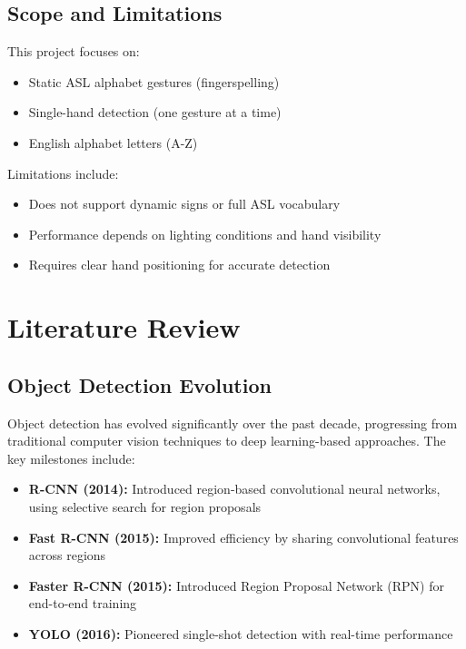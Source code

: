 \documentclass[12pt,a4paper]{article}
\begin{document}
\subsection{Scope and Limitations}

This project focuses on:
\begin{itemize}
    \item Static ASL alphabet gestures (fingerspelling)
    \item Single-hand detection (one gesture at a time)
    \item English alphabet letters (A-Z)
\end{itemize}

Limitations include:
\begin{itemize}
    \item Does not support dynamic signs or full ASL vocabulary
    \item Performance depends on lighting conditions and hand visibility
    \item Requires clear hand positioning for accurate detection
\end{itemize}

\section{Literature Review}

\subsection{Object Detection Evolution}

Object detection has evolved significantly over the past decade, progressing from traditional computer vision techniques to deep learning-based approaches. The key milestones include:

\begin{itemize}
    \item \textbf{R-CNN (2014):} Introduced region-based convolutional neural networks, using selective search for region proposals \cite{girshick2014rcnn}
    \item \textbf{Fast R-CNN (2015):} Improved efficiency by sharing convolutional features across regions \cite{girshick2015fast}
    \item \textbf{Faster R-CNN (2015):} Introduced Region Proposal Network (RPN) for end-to-end training \cite{ren2015faster}
    \item \textbf{YOLO (2016):} Pioneered single-shot detection with real-time performance \cite{redmon2016yolo}
\end{itemize}
\end{document}
